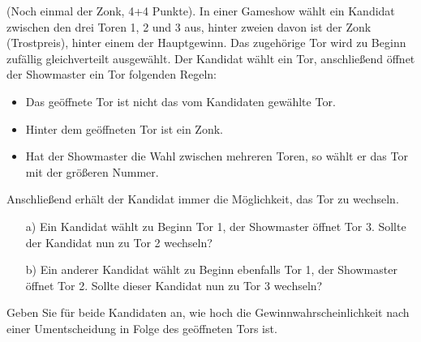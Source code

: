 \documentclass[twoside]{article}
\begin{document}
(Noch einmal der Zonk, 4+4 Punkte).
In einer Gameshow wählt ein Kandidat zwischen den drei Toren 1, 2 und 3 aus, hinter zweien davon ist der Zonk (Trostpreis), hinter einem der Hauptgewinn.
Das zugehörige Tor wird zu Beginn zufällig gleichverteilt ausgewählt.
Der Kandidat wählt ein Tor, anschließend öffnet der Showmaster ein Tor folgenden Regeln:
\begin{itemize}
	\item Das geöffnete Tor ist nicht das vom Kandidaten gewählte Tor.
	\item Hinter dem geöffneten Tor ist ein Zonk.
	\item Hat der Showmaster die Wahl zwischen mehreren Toren, so wählt er das Tor mit der größeren Nummer.
\end{itemize}
Anschließend erhält der Kandidat immer die Möglichkeit, das Tor zu wechseln.
\begin{enumerate}
	\item[a)] Ein Kandidat wählt zu Beginn Tor 1, der Showmaster öffnet Tor 3.
		Sollte der Kandidat nun zu Tor 2 wechseln?
	\item[b)] Ein anderer Kandidat wählt zu Beginn ebenfalls Tor 1, der Showmaster öffnet Tor 2.
		Sollte dieser Kandidat nun zu Tor 3 wechseln?
\end{enumerate}
Geben Sie für beide Kandidaten an, wie hoch die Gewinnwahrscheinlichkeit nach einer Umentscheidung in Folge des geöffneten Tors ist.
\end{document}
